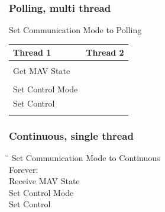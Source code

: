 \documentclass{article}
\begin{document}
\subsubsection{Polling, multi thread}
Set Communication Mode to Polling\\
\begin{tabular}{|l|l|}
\hline
Thread 1 & Thread 2 \\
\hline
\begin{minipage}{0.49\columnwidth}
\vspace{2mm}
Forever:\\
\hspace*{1cm}Get MAV State \\
\vspace{2mm}
\end{minipage} &
\begin{minipage}{0.49\columnwidth}
\vspace{2mm}
Forever:\\
\hspace*{1cm}Set Control Mode\\
\hspace*{1cm}Set Control\\
\vspace{2mm}
\end{minipage} \\
\hline
\end{tabular}

\subsubsection{Continuous, single thread}
\begin{tabbing}
\=\hspace{1cm}\=\hspace{6cm}\=\kill
\>Set Communication Mode to Continuous\\
\>Forever:\\
\>\>Receive MAV State\\
\>\>Set Control Mode\\
\>\>Set Control 
\end{tabbing}
\end{document}
